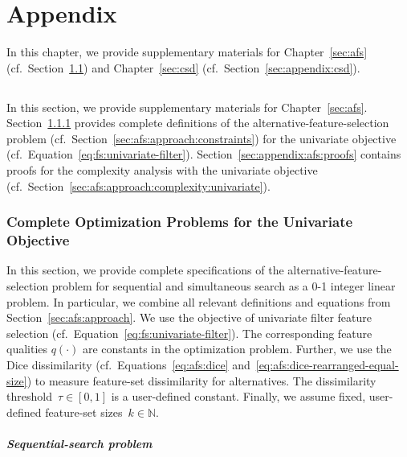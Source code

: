 \chapter{Appendix}
\label{sec:appendix}

In this chapter, we provide supplementary materials for Chapter~\ref{sec:afs} (cf.~Section~\ref{sec:appendix:afs}) and Chapter~\ref{sec:csd} (cf.~Section~\ref{sec:appendix:csd}).

\section{}
\label{sec:appendix:afs}

In this section, we provide supplementary materials for Chapter~\ref{sec:afs}.
Section~\ref{sec:appendix:afs:univariate-complete-optimization-problem} provides complete definitions of the alternative-feature-selection problem (cf.~Section~\ref{sec:afs:approach:constraints}) for the univariate objective (cf.~Equation~\ref{eq:fs:univariate-filter}).
Section~\ref{sec:appendix:afs:proofs} contains proofs for the complexity analysis with the univariate objective (cf.~Section~\ref{sec:afs:approach:complexity:univariate}).

\subsection{Complete Optimization Problems for the Univariate Objective}
\label{sec:appendix:afs:univariate-complete-optimization-problem}

In this section, we provide complete specifications of the alternative-feature-selection problem for sequential and simultaneous search as a 0-1 integer linear problem.
In particular, we combine all relevant definitions and equations from Section~\ref{sec:afs:approach}.
We use the objective of univariate filter feature selection (cf.~Equation~\ref{eq:fs:univariate-filter}).
The corresponding feature qualities $q(\cdot)$ are constants in the optimization problem.
Further, we use the Dice dissimilarity (cf.~Equations~\ref{eq:afs:dice} and~\ref{eq:afs:dice-rearranged-equal-size}) to measure feature-set dissimilarity for alternatives.
The dissimilarity threshold~$\tau \in [0,1]$ is a user-defined constant.
Finally, we assume fixed, user-defined feature-set sizes~$k \in \mathbb{N}$.

\paragraph{Sequential-search problem}

